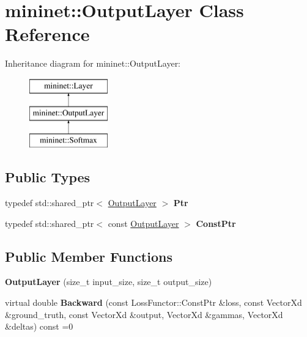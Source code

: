 \hypertarget{classmininet_1_1_output_layer}{}\section{mininet\+:\+:Output\+Layer Class Reference}
\label{classmininet_1_1_output_layer}
Inheritance diagram for mininet\+:\+:Output\+Layer\+:\begin{figure}[H]
\begin{center}
\leavevmode
\includegraphics[height=3.000000cm]{classmininet_1_1_output_layer}
\end{center}
\end{figure}
\subsection*{Public Types}
\begin{DoxyCompactItemize}
\item 
\hypertarget{classmininet_1_1_output_layer_acc7e50578531001eb4e03468f6a55eac}{}\label{classmininet_1_1_output_layer_acc7e50578531001eb4e03468f6a55eac} 
typedef std\+::shared\+\_\+ptr$<$ \hyperlink{classmininet_1_1_output_layer}{Output\+Layer} $>$ {\bfseries Ptr}
\item 
\hypertarget{classmininet_1_1_output_layer_a96657e2d32023e3025e55c3dffc4bca2}{}\label{classmininet_1_1_output_layer_a96657e2d32023e3025e55c3dffc4bca2} 
typedef std\+::shared\+\_\+ptr$<$ const \hyperlink{classmininet_1_1_output_layer}{Output\+Layer} $>$ {\bfseries Const\+Ptr}
\end{DoxyCompactItemize}
\subsection*{Public Member Functions}
\begin{DoxyCompactItemize}
\item 
\hypertarget{classmininet_1_1_output_layer_abe454b2360d589f5ff00daa3cf699d91}{}\label{classmininet_1_1_output_layer_abe454b2360d589f5ff00daa3cf699d91} 
{\bfseries Output\+Layer} (size\+\_\+t input\+\_\+size, size\+\_\+t output\+\_\+size)
\item 
\hypertarget{classmininet_1_1_output_layer_a8b863c7c620886f745578a58e03c4fb9}{}\label{classmininet_1_1_output_layer_a8b863c7c620886f745578a58e03c4fb9} 
virtual double {\bfseries Backward} (const Loss\+Functor\+::\+Const\+Ptr \&loss, const Vector\+Xd \&ground\+\_\+truth, const Vector\+Xd \&output, Vector\+Xd \&gammas, Vector\+Xd \&deltas) const =0
\end{DoxyCompactItemize}
